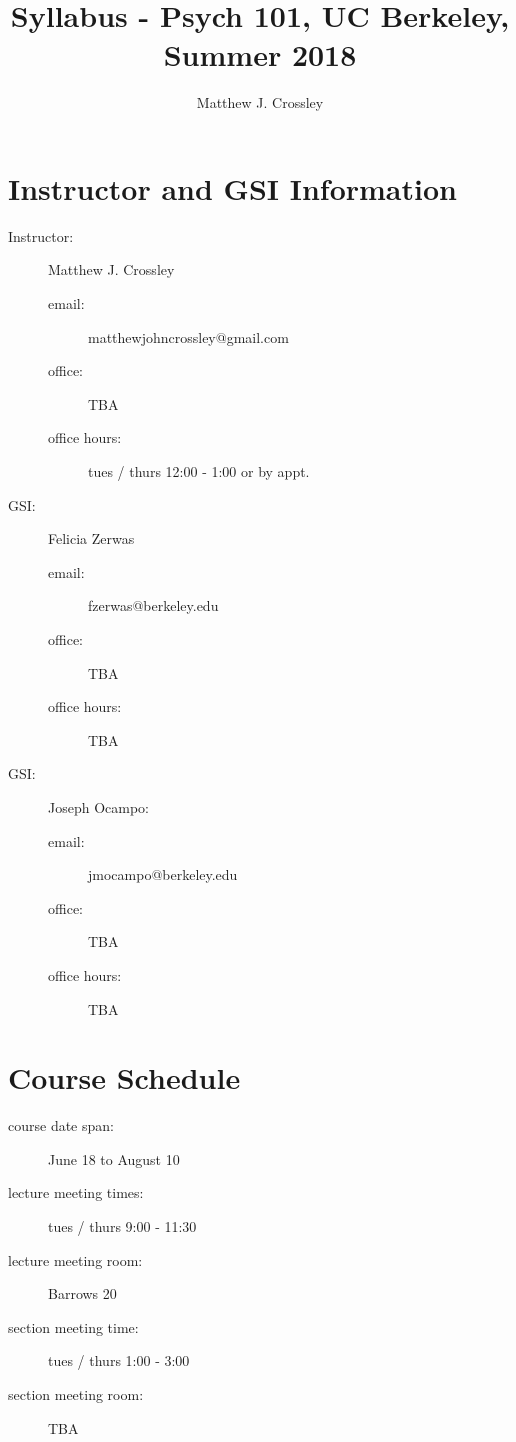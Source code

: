 \documentclass{article}
\begin{document}
\title{Syllabus - Psych 101, UC Berkeley, Summer 2018}
\author{Matthew J. Crossley}
\maketitle

\section{Instructor and GSI Information}
\begin{description}
\item [Instructor:] Matthew J. Crossley
  \begin{description}
  \item [email:] matthewjohncrossley@gmail.com
  \item [office:] TBA
  \item [office hours:] tues / thurs 12:00 - 1:00 or by appt.
  \end{description}

\item [GSI:] Felicia Zerwas
  \begin{description}
  \item [email:] fzerwas@berkeley.edu
  \item [office:] TBA
  \item [office hours:] TBA
  \end{description}

\item [GSI:] Joseph Ocampo:
    \begin{description}
  \item [email:] jmocampo@berkeley.edu
  \item [office:] TBA
  \item [office hours:] TBA
  \end{description}
\end{description}

\section{Course Schedule}
\begin{description}
\item [course date span:] June 18 to August 10
\item [lecture meeting times:] tues / thurs 9:00 - 11:30
\item [lecture meeting room:] Barrows 20
\item [section meeting time:] tues / thurs 1:00 - 3:00
\item [section meeting room:] TBA
\end{description}
\end{document}
